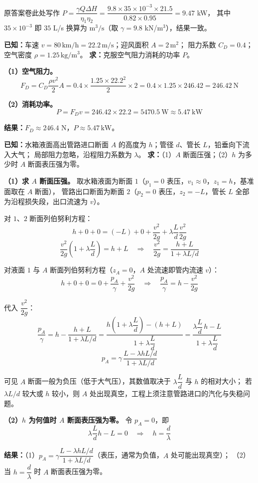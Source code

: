 \begin{tishi}
原答案卷此处写作 $P=\dfrac{\gamma Q\Delta H}{\eta_1\eta_2}=\dfrac{9.8\times35\times10^{-3}\times21.5}{0.82\times0.95}=9.47$ kW，
其中 $35\times10^{-3}$ 即 $35$ L/s 换算为 $\mathrm{m^3/s}$（取 $\gamma=9.8$ kN/m$^3$），结果一致。
\end{tishi}


\begin{jie}
\textbf{已知：}车速 $v=80\,\mathrm{km/h}=22.2\,\mathrm{m/s}$；迎风面积 $A=2\,\mathrm{m^2}$；
阻力系数 $C_D=0.4$；空气密度 $\rho=1.25\,\mathrm{kg/m^3}$。
\textbf{求：}克服空气阻力消耗的功率 $P$。

\textbf{（1）空气阻力。}
\[
F_D=C_D\frac{\rho v^2}{2}A=0.4\times\frac{1.25\times22.2^2}{2}\times2
=0.4\times1.25\times246.42=246.42\ \mathrm{N}
\]

\textbf{（2）消耗功率。}
\[
P=F_Dv=246.42\times22.2=5470.5\ \mathrm{W}\approx5.47\ \mathrm{kW}
\]

\textbf{结果：}$F_D\approx246.4$ N，$P\approx5.47\,\mathrm{kW}$。
\end{jie}


\begin{jie}
\textbf{已知：}水箱液面高出管路进口断面 $A$ 的高度为 $h$；管径 $d$、管长 $L$，铅垂向下流入大气；
局部阻力忽略，沿程阻力系数为 $\lambda$。
\textbf{求：}（1）$A$ 断面压强；（2）$h$ 为多少时 $A$ 断面表压强为零。

\textbf{（1）求 $A$ 断面压强。}
取水箱液面为断面 $1$（$p_1=0$ 表压，$v_1\approx0$，$z_1=h$，基准面取在 $A$ 断面），
管路出口断面为断面 $2$（$p_2=0$ 表压，$z_2=-L$，管长 $L$ 全部为沿程损失段，出口流速为 $v$）。

对 $1$、$2$ 断面列伯努利方程：
\[
h+0+0=(-L)+0+\frac{v^2}{2g}+\lambda\frac{L}{d}\frac{v^2}{2g}
\]
\[
\frac{v^2}{2g}\left(1+\lambda\frac{L}{d}\right)=h+L
\quad\Longrightarrow\quad
\frac{v^2}{2g}=\frac{h+L}{1+\lambda L/d}
\]

对液面 $1$ 与 $A$ 断面列伯努利方程（$z_A=0$，$A$ 处流速即管内流速 $v$）：
\[
h+0+0=0+\frac{p_A}{\gamma}+\frac{v^2}{2g}
\quad\Longrightarrow\quad
\frac{p_A}{\gamma}=h-\frac{v^2}{2g}
\]

代入 $\dfrac{v^2}{2g}$：
\[
\frac{p_A}{\gamma}=h-\frac{h+L}{1+\lambda L/d}
=\frac{h\left(1+\lambda\dfrac{L}{d}\right)-(h+L)}{1+\lambda\dfrac{L}{d}}
=\frac{\lambda\dfrac{L}{d}\,h-L}{1+\lambda\dfrac{L}{d}}
\]
\[
\boxed{\;p_A=\gamma\,\frac{L-\lambda hL/d}{1+\lambda L/d}\;}
\]

可见 $A$ 断面一般为负压（低于大气压），其数值取决于 $\lambda\dfrac{L}{d}$ 与 $h$ 的相对大小；
若 $\lambda L/d$ 较大或 $h$ 较小，则 $A$ 处出现真空，工程上须注意管路进口的汽化与失稳问题。

\textbf{（2）$h$ 为何值时 $A$ 断面表压强为零。}
令 $p_A=0$，即
\[
\lambda\frac{L}{d}h-L=0
\quad\Longrightarrow\quad
h=\frac{d}{\lambda}
\]

\textbf{结果：}（1）$p_A=\gamma\dfrac{L-\lambda hL/d}{1+\lambda L/d}$（表压，通常为负值，$A$ 处可能出现真空）；
（2）当 $\boxed{h=\dfrac{d}{\lambda}}$ 时 $A$ 断面表压强为零。
\end{jie}

